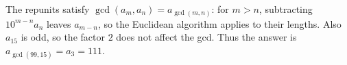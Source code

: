 The repunits satisfy $\gcd(a_m,a_n)=a_{\gcd(m,n)}$: for $m>n$, subtracting $10^{m-n}a_n$ leaves $a_{m-n}$, so the Euclidean algorithm applies to their lengths. Also $a_{15}$ is odd, so the factor $2$ does not affect the gcd. Thus the answer is $a_{\gcd(99,15)}=a_3=\boxed{111}$.

